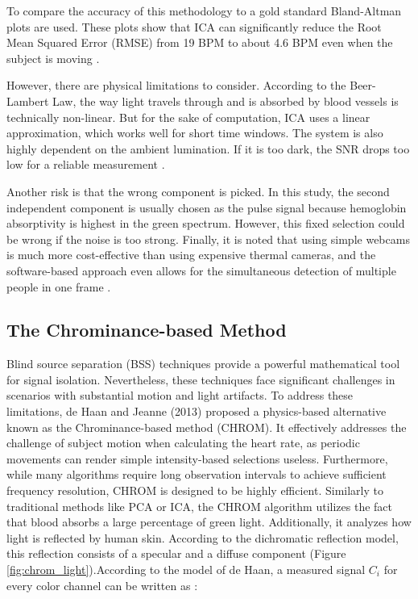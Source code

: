 To compare the accuracy of this methodology to a gold standard Bland-Altman plots are used. These plots show that ICA can significantly reduce the Root Mean Squared Error (RMSE) from 19 BPM to about 4.6 BPM even when the subject is moving \cite{poh2010non}.

However, there are physical limitations to consider. According to the Beer-Lambert Law, the way light travels through and is absorbed by blood vessels is technically non-linear. But for the sake of computation, ICA uses a linear approximation, which works well for short time windows. The system is also highly dependent on the ambient lumination. If it is too dark, the SNR drops too low for a reliable measurement \cite{poh2010non}.

Another risk is that the wrong component is picked. In this study, the second independent component is usually chosen as the pulse signal because hemoglobin absorptivity is highest in the green spectrum. However, this fixed selection could be wrong if the noise is too strong. Finally, it is noted that using simple webcams is much more cost-effective than using expensive thermal cameras, and the software-based approach even allows for the simultaneous detection of multiple people in one frame \cite{poh2010non}.

\subsection{The Chrominance-based Method}

Blind source separation (BSS) techniques provide a powerful mathematical tool for signal isolation. Nevertheless, these techniques face significant challenges in scenarios with substantial motion and light artifacts. To address these limitations, de Haan and Jeanne (2013) proposed a physics-based alternative known as the Chrominance-based method (CHROM). It effectively addresses the challenge of subject motion when calculating the heart rate, as periodic movements can render simple intensity-based selections useless. Furthermore, while many algorithms require long observation intervals to achieve sufficient frequency resolution, CHROM is designed to be highly efficient. Similarly to traditional methods like PCA or ICA, the CHROM algorithm utilizes the fact that blood absorbs a large percentage of green light. Additionally, it analyzes how light is reflected by human skin. According to the dichromatic reflection model, this reflection consists of a specular and a diffuse component (Figure \ref{fig:chrom_light}).According to the model of de Haan, a measured signal $C_i$ for every color channel can be written as \cite{dehaan2013chrom}:

